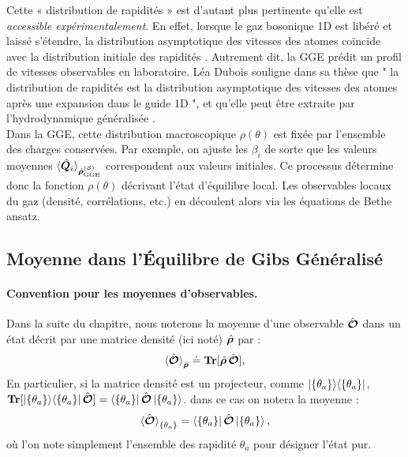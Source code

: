 Cette « distribution de rapidités » est d’autant plus pertinente qu’elle est {\em accessible expérimentalement}. En effet, lorsque le gaz bosonique 1D est libéré et laissé s’étendre, la distribution asymptotique des vitesses des atomes coïncide avec la distribution initiale des rapidités \cite{??} . Autrement dit, la GGE prédit un profil de vitesses observables en laboratoire. Léa Dubois souligne dans sa thèse que " la distribution de rapidités est la distribution asymptotique des vitesses des atomes après une expansion dans le guide 1D ", et qu’elle peut être extraite par l’hydrodynamique généralisée \cite{??}. \\

Dans la GGE, cette distribution macroscopique $\rho(\theta)$ est fixée par l’ensemble des charges conservées. Par exemple, on ajuste les $\beta_i$ de sorte que les valeurs moyennes $\langle \hat{\bm{Q}}_i \rangle_{\hat{\bm{\rho}}^{(\mathcal{S})}_{\mathrm{GGE}}}$ correspondent aux valeurs initiales. Ce processus détermine donc la fonction $\rho(\theta)$ décrivant l’état d’équilibre local. Les observables locaux du gaz (densité, corrélations, etc.) en découlent alors via les équations de Bethe ansatz. 


\subsection{Moyenne dans l'Équilibre de Gibs Généralisé}

\paragraph{Convention pour les moyennes d'observables.}
Dans la suite du chapitre, nous noterons la moyenne d’une observable $\hat{\bm{\mathcal{O}}}$ dans un état décrit par une matrice densité (ici noté) $\hat{\bm{\rho}}$ par :
\begin{eqnarray}\label{chap.TBA.moy.dens}	
	\braket{\hat{\bm{\mathcal{O}}}}_{\hat{\bm{\rho}}} \doteq \bm{\mathrm{Tr}}[\hat{\bm{\rho}} \, \hat{\bm{\mathcal{O}}}],
\end{eqnarray}
En particulier, si la matrice densité est un projecteur, comme $\ket{\{\theta_a \}}\!\bra{\{\theta_a \}}$, $\bm{\mathrm{Tr}}[\ket{\{\theta_a \}}\!\bra{\{\theta_a \}} \hat{\bm{\mathcal{O}}}] =  \bra{\{\theta_a \}}\hat{\bm{\mathcal{O}}}\ket{\{\theta_a \}}$. dans ce cas on notera la moyenne :
\begin{eqnarray}\label{chap.TBA.moy.dens.pur}
	\braket{\hat{\bm{\mathcal{O}}}}_{\{\theta_a \}} = \bra{\{\theta_a \}} \hat{\bm{\mathcal{O}}} \ket{\{\theta_a \}},
\end{eqnarray}
où l’on note simplement l’ensemble des rapidité ${\theta_a}$ pour désigner l’état pur.

